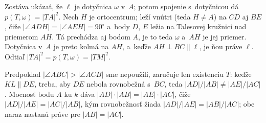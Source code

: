 {    Zostáva ukázať, že $\ell$ je dotyčnica $\omega$ v~$A$; potom spojenie s~dotyčnicou dá $p(T,\omega) = |TA|^2$. Nech $H$ je ortocentrum; leží vnútri (teda $H \neq A$) na $CD$ aj $BE$, čiže $|\angle ADH| = |\angle AEH| = 90^\circ$ a~body $D$, $E$ ležia na Talesovej kružnici nad priemerom $AH$. Tá prechádza aj bodom $A$, je to teda $\omega$ a~$AH$ je jej priemer. Dotyčnica v~$A$ je preto kolmá na $AH$, a~keďže $AH \perp BC \parallel \ell$, je ňou práve $\ell$. Odtiaľ $|TA|^2 = p(T,\omega) = |TM|^2$.

    Predpoklad $|\angle ABC| > |\angle ACB|$ sme nepoužili, zaručuje len existenciu $T$: keďže $KL \parallel DE$, treba, aby $DE$ nebola rovnobežná s~$BC$, teda $|AD|/|AB| \neq |AE|/|AC|$. Mocnosť bodu $A$ ku $k$ dáva $|AD| \cdot |AB| = |AE| \cdot |AC|$, čiže $|AD|/|AE| = |AC|/|AB|$, kým rovnobežnosť žiada $|AD|/|AE| = |AB|/|AC|$; obe naraz nastanú práve pre $|AB| = |AC|$.
}

